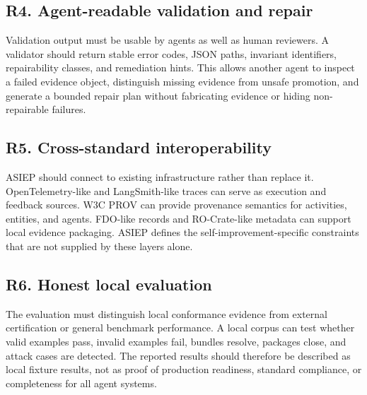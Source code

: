 \subsection{R4. Agent-readable validation and repair}

Validation output must be usable by agents as well as human reviewers. A validator should return stable error codes, JSON paths, invariant identifiers, repairability classes, and remediation hints. This allows another agent to inspect a failed evidence object, distinguish missing evidence from unsafe promotion, and generate a bounded repair plan without fabricating evidence or hiding non-repairable failures.

\subsection{R5. Cross-standard interoperability}

ASIEP should connect to existing infrastructure rather than replace it. OpenTelemetry-like and LangSmith-like traces can serve as execution and feedback sources. W3C PROV can provide provenance semantics for activities, entities, and agents. FDO-like records and RO-Crate-like metadata can support local evidence packaging. ASIEP defines the self-improvement-specific constraints that are not supplied by these layers alone.

\subsection{R6. Honest local evaluation}

The evaluation must distinguish local conformance evidence from external certification or general benchmark performance. A local corpus can test whether valid examples pass, invalid examples fail, bundles resolve, packages close, and attack cases are detected. The reported results should therefore be described as local fixture results, not as proof of production readiness, standard compliance, or completeness for all agent systems.
